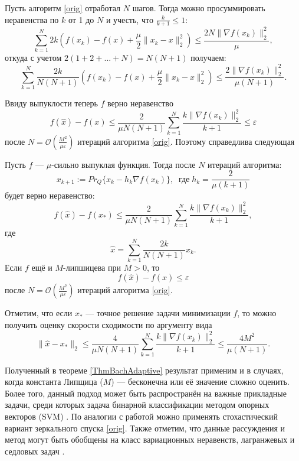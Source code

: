     Пусть алгоритм \eqref{orig} отработал $N$ шагов. Тогда можно просуммировать неравенства по $k$ от 1 до $N$ и учесть, что $\frac{k}{k+1} \leq 1$:
    $$
        \sum_{k=1}^{N} 2k(f(x_k) - f(x) + \frac{\mu}{2} \| x_k - x \|^2_2) \leq \frac{2N\|\nabla f(x_k)\|^2_2}{\mu},
    $$
    откуда с учетом $2(1 + 2 +...+ N) = N(N + 1)$ получаем:
    $$
        \sum_{k=1}^{N} \frac{2k}{N(N + 1)} (f(x_k) - f(x) + \frac{\mu}{2} \| x_k - x \|^2_2) \leq \frac{2\|\nabla f(x_k)\|^2_2}{\mu(N + 1)}.
    $$

    Ввиду выпуклости теперь $f$ верно неравенство
    $$
         f(\widehat{x}) - f(x) \leq \frac{2}{\mu N (N + 1)} \sum_{k=1}^{N} \frac{k \| \nabla f(x_k)\|^2_2}{k + 1} \leq \varepsilon
    $$
    после $N = \mathcal{O}(\frac{M^2}{\mu\varepsilon})$ итераций алгоритма \eqref{orig}. Поэтому справедлива следующая
    \begin{theorem}\label{ThmBachAdaptive}
        Пусть $f$ --- $\mu$-сильно выпуклая функция. Тогда после $N$ итераций алгоритма:
        $$
            x_{k+1} := Pr_{Q}\{x_k - h_k \nabla f(x_k) \}, \;\; \textit{где} \; h_k = \frac{2}{\mu (k+1)}
        $$
        будет верно неравенство:
        \begin{equation}\label{adaptive_estimation_f}
            f(\widehat{x}) - f(x_*) \leq \frac{2}{\mu N (N+1)} \sum_{k=1}^{N} \frac{k \|\nabla f(x_k)\|_2^2}{k+1},
        \end{equation}
        где
        $$
            \widehat{x} = \sum_{k=1}^{N} \frac{2 k}{N (N+1)} x_k.
        $$
        Если $f$ ещё и $M$-липшицева при $M >0$, то
        $$
             f(\widehat{x}) - f(x) \leq \varepsilon
        $$
        после $N = \mathcal{O}(\frac{M^2}{\mu\varepsilon})$ итераций алгоритма \eqref{orig}.
    \end{theorem}

    Отметим, что если $x_*$ --- точное решение задачи минимизации $f$, то можно получить оценку скорости сходимости по аргументу вида
    \begin{equation} \label{arg_est}
        \|\widehat{x} - x_*\|_2 \leq \frac{4}{\mu N (N+1)} \sum_{k=1}^{N} \frac{k \|\nabla f(x_k)\|_2^2}{k+1} \leq \frac{4M^2}{\mu(N+1)}.
    \end{equation}

    Полученный в теореме \ref{ThmBachAdaptive} результат применим и в случаях, когда константа Липщица ($M$) --- бесконечна или её значение сложно оценить. Более того, данный подход может быть распространён на важные прикладные задачи, среди которых задача бинарной классификации методом опорных векторов (SVM) \cite{Bach_2012}. По аналогии с работой \cite{Bach_2012} можно применять стохастический вариант зеркального спуска \eqref{orig}. Также отметим, что данные рассуждения и метод могут быть обобщены на класс вариационных неравенств, лагранжевых и седловых задач \cite{Stonyakin_2021}. 

